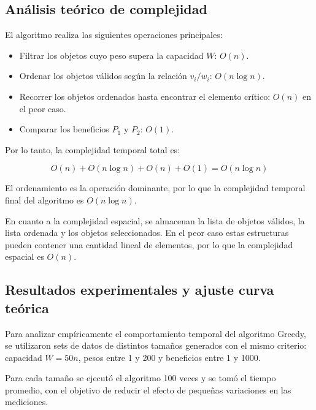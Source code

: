 \documentclass[11pt,a4paper]{article}
\begin{document}
\subsection{Análisis teórico de complejidad}

El algoritmo realiza las siguientes operaciones principales:

\begin{itemize}
    \item Filtrar los objetos cuyo peso supera la capacidad $W$: $O(n)$.
    \item Ordenar los objetos válidos según la relación $v_i/w_i$: $O(n \log n)$.
    \item Recorrer los objetos ordenados hasta encontrar el elemento crítico:
    $O(n)$ en el peor caso.
    \item Comparar los beneficios $P_1$ y $P_2$: $O(1)$.
\end{itemize}

Por lo tanto, la complejidad temporal total es:

\[
O(n) + O(n \log n) + O(n) + O(1) = O(n \log n)
\]

El ordenamiento es la operación dominante, por lo que la complejidad temporal
final del algoritmo es $O(n \log n)$.

En cuanto a la complejidad espacial, se almacenan la lista de objetos válidos,
la lista ordenada y los objetos seleccionados. En el peor caso estas estructuras
pueden contener una cantidad lineal de elementos, por lo que la complejidad
espacial es $O(n)$.

\subsection{Resultados experimentales y ajuste curva teórica}

Para analizar empíricamente el comportamiento temporal del algoritmo Greedy,
se utilizaron sets de datos de distintos tamaños generados con el mismo criterio:
capacidad $W=50n$, pesos entre 1 y 200 y beneficios entre 1 y 1000.

Para cada tamaño se ejecutó el algoritmo 100 veces y se tomó el tiempo promedio,
con el objetivo de reducir el efecto de pequeñas variaciones en las mediciones.
\end{document}
